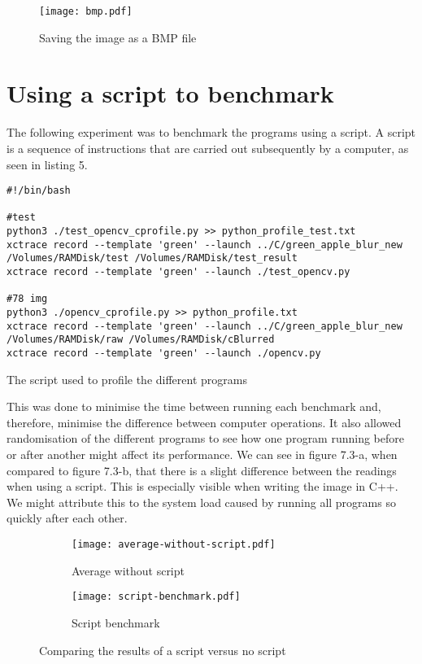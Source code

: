 \begin{figure}[H]
	\centering
	\texttt{[image: bmp.pdf]}
	\caption{Saving the image as a BMP file}
	\label{figure:bmp}
\end{figure}

\section{Using a script to benchmark}
The following experiment was to benchmark the programs using a script. A script is a sequence of instructions that are carried out subsequently by a computer, as seen in listing 5.

\begin{listing}[!ht]
	\begin{verbatim}
#!/bin/bash

#test
python3 ./test_opencv_cprofile.py >> python_profile_test.txt
xctrace record --template 'green' --launch ../C/green_apple_blur_new
/Volumes/RAMDisk/test /Volumes/RAMDisk/test_result
xctrace record --template 'green' --launch ./test_opencv.py

#78 img
python3 ./opencv_cprofile.py >> python_profile.txt
xctrace record --template 'green' --launch ../C/green_apple_blur_new
/Volumes/RAMDisk/raw /Volumes/RAMDisk/cBlurred
xctrace record --template 'green' --launch ./opencv.py
	\end{verbatim}
	\caption{The script used to profile the different programs}
	\label{listing:script}
	\end{listing}

This was done to minimise the time between running each benchmark and, therefore, minimise the difference between computer operations. It also allowed randomisation of the different programs to see how one program running before or after another might affect its performance.
We can see in figure 7.3-a, when compared to figure 7.3-b, that there is a slight difference between the readings when using a script. This is especially visible when writing the image in C++. We might attribute this to the system load caused by running all programs so quickly after each other.

\begin{figure}[H]
	\centering
	\begin{subfigure}{.5\textwidth}
	  \centering
	  \texttt{[image: average-without-script.pdf]}
	  \caption{Average without script}
	  \label{fig:no-script}
	\end{subfigure}%
	\begin{subfigure}{.5\textwidth}
	  \centering
	  \texttt{[image: script-benchmark.pdf]}
	  \caption{Script benchmark}
	  \label{fig:script}
	\end{subfigure}
	\caption{Comparing the results of a script versus no script}
	\label{fig:script-vs-noscript}
\end{figure}

